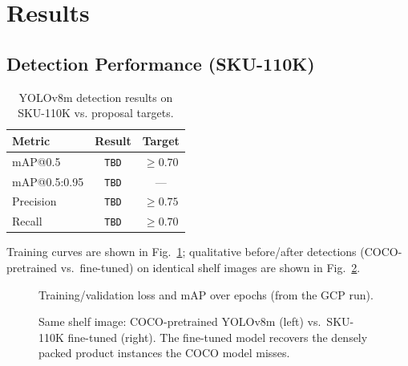 \section{Results}
\subsection{Detection Performance (SKU-110K)}

\begin{table}[t]
\centering
\caption{YOLOv8m detection results on SKU-110K vs. proposal targets.}
\label{tab:det-results}
\begin{tabular}{lcc}
\toprule
Metric & Result & Target \\
\midrule
mAP@0.5        & \texttt{TBD} & $\geq 0.70$ \\
mAP@0.5:0.95   & \texttt{TBD} & --- \\
Precision      & \texttt{TBD} & $\geq 0.75$ \\
Recall         & \texttt{TBD} & $\geq 0.70$ \\
\bottomrule
\end{tabular}
\end{table}

Training curves are shown in Fig.~\ref{fig:curves}; qualitative before/after detections
(COCO-pretrained vs.\ fine-tuned) on identical shelf images are shown in
Fig.~\ref{fig:before-after}.

\begin{figure}[t]
\centering
\caption{Training/validation loss and mAP over epochs (from the GCP run).}
\label{fig:curves}
\end{figure}

\begin{figure}[t]
\centering
\caption{Same shelf image: COCO-pretrained YOLOv8m (left) vs.\ SKU-110K fine-tuned (right). The
fine-tuned model recovers the densely packed product instances the COCO model misses.}
\label{fig:before-after}
\end{figure}


